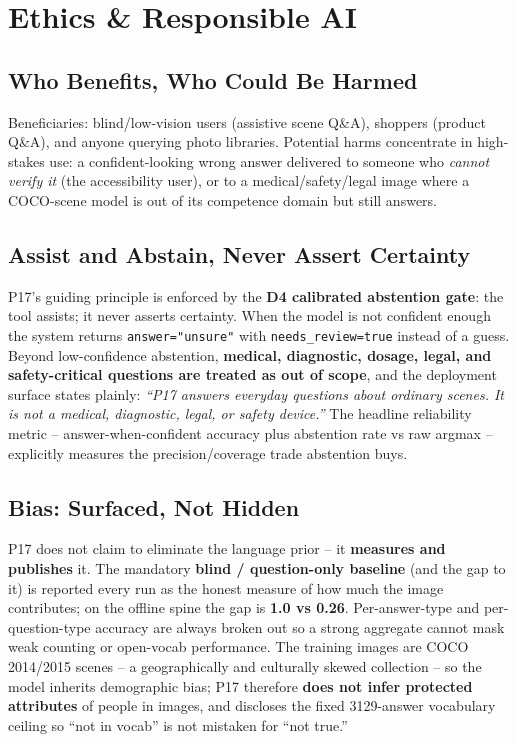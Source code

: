 \documentclass[12pt,a4paper]{article}
\begin{document}
\section{Ethics \& Responsible AI}

\subsection{Who Benefits, Who Could Be Harmed}

Beneficiaries: blind/low-vision users (assistive scene Q\&A), shoppers (product Q\&A), and anyone querying photo libraries. Potential harms concentrate in high-stakes use: a confident-looking wrong answer delivered to someone who \emph{cannot verify it} (the accessibility user), or to a medical/safety/legal image where a COCO-scene model is out of its competence domain but still answers.

\subsection{Assist and Abstain, Never Assert Certainty}

P17's guiding principle is enforced by the \textbf{D4 calibrated abstention gate}: the tool assists; it never asserts certainty. When the model is not confident enough the system returns \texttt{answer="unsure"} with \texttt{needs\_review=true} instead of a guess. Beyond low-confidence abstention, \textbf{medical, diagnostic, dosage, legal, and safety-critical questions are treated as out of scope}, and the deployment surface states plainly: \emph{``P17 answers everyday questions about ordinary scenes. It is not a medical, diagnostic, legal, or safety device.''} The headline reliability metric -- answer-when-confident accuracy plus abstention rate vs raw argmax -- explicitly measures the precision/coverage trade abstention buys.

\subsection{Bias: Surfaced, Not Hidden}

P17 does not claim to eliminate the language prior -- it \textbf{measures and publishes} it. The mandatory \textbf{blind / question-only baseline} (and the gap to it) is reported every run as the honest measure of how much the image contributes; on the offline spine the gap is \textbf{1.0 vs 0.26}. Per-answer-type and per-question-type accuracy are always broken out so a strong aggregate cannot mask weak counting or open-vocab performance. The training images are COCO 2014/2015 scenes -- a geographically and culturally skewed collection -- so the model inherits demographic bias; P17 therefore \textbf{does not infer protected attributes} of people in images, and discloses the fixed 3129-answer vocabulary ceiling so ``not in vocab'' is not mistaken for ``not true.''
\end{document}
